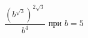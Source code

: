\begin{ex}
	\begin{condition}
		\( \dfrac{(b^{\sqrt{3}})^{2\sqrt{3}}}{b^4} \) при \( b=5 \)
	\end{condition}
\end{ex}